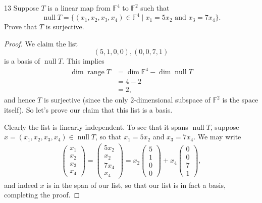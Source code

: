 \documentclass{extarticle}
\newenvironment{problem}[1]{\begin{prob*}{#1}{}}{\end{prob*}}
\newcommand{\F}{\mathbb{F}}
\DeclareMathOperator{\Null}{null}
\DeclareMathOperator{\Range}{range}
\begin{document}
\begin{problem}{13}
Suppose $T$ is a linear map from $\F^4$ to $\F^2$ such that
\begin{equation*}
\Null T = \{(x_1,x_2,x_3,x_4)\in\F^4\mid x_1 = 5x_2\text{ and }x_3 = 7x_4\}.
\end{equation*}
Prove that $T$ is surjective.
\end{problem}
\begin{proof}
We claim the list
\begin{equation*}
(5, 1, 0, 0), (0, 0, 7, 1)
\end{equation*}
is a basis of $\Null T$.  This implies
\begin{align*}
\dim \Range T &= \dim\F^4 - \dim\Null T\\
&= 4 - 2\\
&= 2,
\end{align*}
and hence $T$ is surjective (since the only $2$-dimensional subspace of $\F^2$ is the space itself).  So let's prove our claim that this list is a basis.  
\par Clearly the list is linearly independent.  To see that it spans $\Null T$, suppose $x=(x_1,x_2,x_3,x_4)\in \Null T$, so that $x_1 = 5x_2$ and $x_3 = 7x_4$.  We may write
\begin{align*}
\begin{pmatrix}x_1\\x_2\\x_3\\x_4 \end{pmatrix} = \begin{pmatrix}5x_2\\x_2\\7x_4\\x_4 \end{pmatrix} = x_2\begin{pmatrix}5\\1\\0\\0\end{pmatrix}  + x_4\begin{pmatrix}0\\0\\7\\1\end{pmatrix},
\end{align*}
and indeed $x$ is in the span of our list, so that our list is in fact a basis, completing the proof.
\end{proof}
\end{document}
